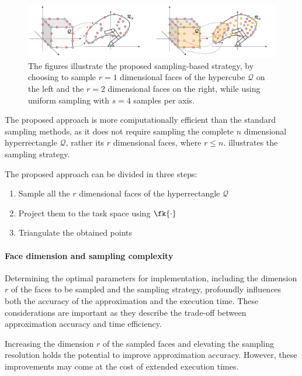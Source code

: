 \begin{figure}[!h]
    \centering
    \includegraphics[width=\textwidth]{Papers/images/curved_space_algo_new_faces.pdf}
    \caption{The figures illustrate the proposed sampling-based strategy, by choosing to sample $r=1$ dimensional faces of the hypercube $\mathcal{Q}$ on the left and the $r=2$ dimensional faces on the right, while using uniform sampling with $s=4$ samples per axis.}
    \label{fig:curved_space_algo_new_faces}
\end{figure}

The proposed approach is more computationally efficient than the standard sampling methods, as it does not require sampling the complete $n$ dimensional hyperrectangle $\mathcal{Q}$, rather its $r$ dimensional faces, where $r\leq n$.  illustrates the sampling strategy. 

The proposed approach can be divided in three steps:
\begin{enumerate}
    \item Sample all the $r$ dimensional faces of the hyperrectangle $\mathcal{Q}$
    \item Project them to the task space using $\fk{\cdot}$
    \item Triangulate the obtained points
\end{enumerate}

\paragraph*{Face dimension and sampling complexity} Determining the optimal parameters for implementation, including the dimension $r$ of the faces to be sampled and the sampling strategy, profoundly influences both the accuracy of the approximation and the execution time. These considerations are important as they describe the trade-off between approximation accuracy and time efficiency.

Increasing the dimension $r$ of the sampled faces and elevating the sampling resolution holds the potential to improve approximation accuracy. However, these improvements may come at the cost of extended execution times.

